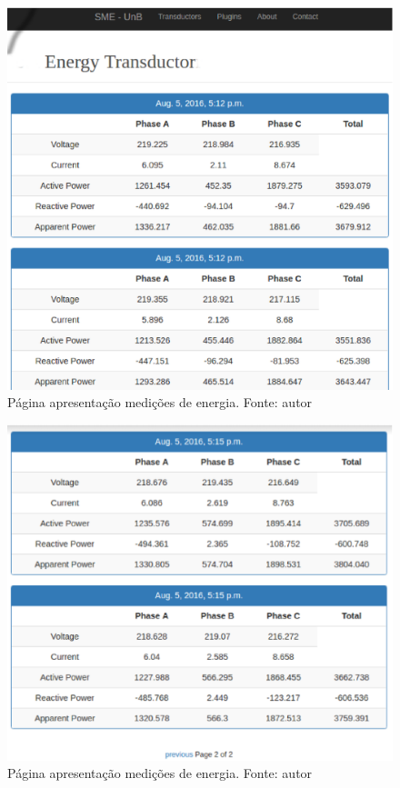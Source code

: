 \begin{figure}[!htpb]
    \centering
    \includegraphics[keepaspectratio=true,scale=0.5]{figuras/coleta_dados_01.eps}
    \caption{Página apresentação medições de energia. Fonte: autor}
    \label{dados01}
\end{figure}

\begin{figure}[!htpb]
    \centering
    \includegraphics[keepaspectratio=true,scale=0.5]{figuras/coleta_dados_02.eps}
    \caption{Página apresentação medições de energia. Fonte: autor}
    \label{dados02}
\end{figure}

